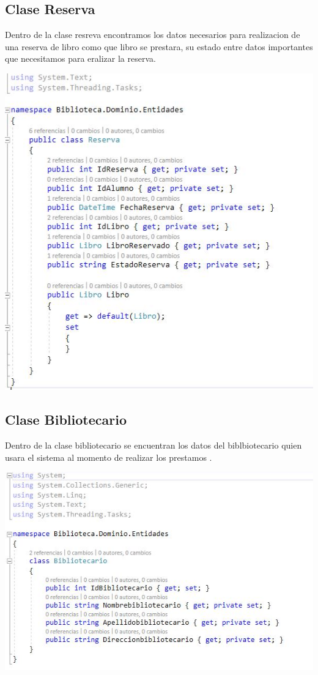  \subsection{Clase Reserva}
 Dentro de la clase resreva encontramos los datos necesarios para realizacion de una reserva de libro como que libro se prestara, su estado entre datos importantes que necesitamos para eralizar la reserva.
 	\begin{center}
	\includegraphics[width=14cm]{./Imagenes/img13reserva} 
	\end{center}
	
 \newpage
 \subsection{Clase Bibliotecario}
 Dentro de la clase  bibliotecario se encuentran los datos del biblbiotecario quien usara el sistema al momento de realizar los prestamos .
 	\begin{center}
	\includegraphics[width=14cm]{./Imagenes/img11bibliotecario} 
	\end{center}

